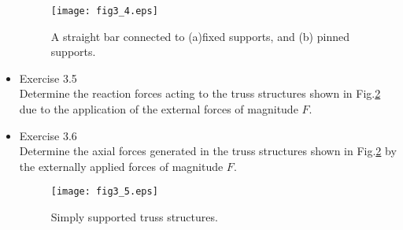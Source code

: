 \documentclass[10pt,a4j]{article}
\begin{document}
\begin{itemize}
\begin{figure}[h]
	\begin{center}
	\texttt{[image: fig3\_4.eps]} 
	\end{center}
	\caption{A straight bar connected to (a)fixed supports, and (b) pinned supports.} 
	\label{fig:fig3_4}
\end{figure}
\item
Exercise 3.5\\
Determine the reaction forces acting to the truss structures shown in Fig.\ref{fig:fig3_5} 
due to the application of the external forces of magnitude $F$.
\item
Exercise 3.6\\
Determine the axial forces generated in the truss structures shown in Fig.\ref{fig:fig3_5}
by the externally applied forces of magnitude $F$.
\begin{figure}[h]
	\begin{center}
	\texttt{[image: fig3\_5.eps]} 
	\end{center}
	\caption{Simply supported truss structures.} 
	\label{fig:fig3_5}
\end{figure}
\end{itemize}
\end{document}
